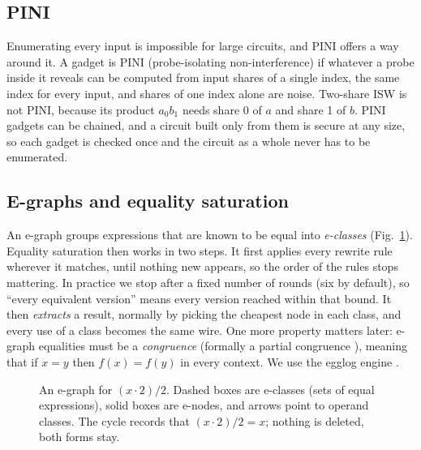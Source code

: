 \documentclass[conference]{IEEEtran}
\begin{document}
\subsection{PINI}
Enumerating every input is impossible for large circuits, and PINI \cite{cassiers2020pini} offers a way around it. A gadget is PINI (probe-isolating non-interference) if whatever a probe inside it reveals can be computed from input shares of a single index, the same index for every input, and shares of one index alone are noise. Two-share ISW is not PINI, because its product $a_0b_1$ needs share 0 of $a$ and share 1 of $b$. PINI gadgets can be chained, and a circuit built only from them is secure at any size, so each gadget is checked once and the circuit as a whole never has to be enumerated.

\subsection{E-graphs and equality saturation}
An e-graph groups expressions that are known to be equal into \emph{e-classes} (Fig.~\ref{fig:egraph}). Equality saturation then works in two steps. It first applies every rewrite rule wherever it matches, until nothing new appears, so the order of the rules stops mattering. In practice we stop after a fixed number of rounds (six by default), so ``every equivalent version'' means every version reached within that bound. It then \emph{extracts} a result, normally by picking the cheapest node in each class, and every use of a class becomes the same wire. One more property matters later: e-graph equalities must be a \emph{congruence} (formally a partial congruence \cite{suciu2025semantic}), meaning that if $x=y$ then $f(x)=f(y)$ in every context. We use the egglog engine \cite{zhang2023egglog}.

\begin{figure}[!t]
\centering
{}
\caption{An e-graph for $(x\cdot 2)/2$. Dashed boxes are e-classes (sets of equal expressions), solid boxes are e-nodes, and arrows point to operand classes. The cycle records that $(x\cdot 2)/2=x$; nothing is deleted, both forms stay.}\label{fig:egraph}
\end{figure}
\end{document}
